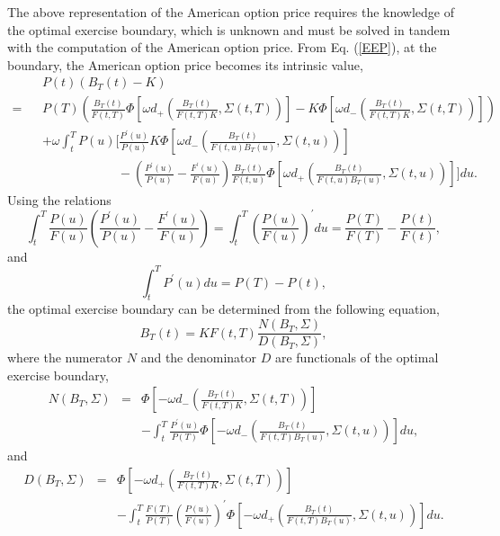 \documentclass[12pt]{article}
\begin{document}
    The above representation of the American option price requires the knowledge of the optimal
    exercise boundary, which is unknown and must be solved in tandem with the computation of the American
    option price. From Eq. (\ref{EEP}), at the boundary, the American option price becomes its intrinsic
    value,
    \begin{eqnarray}
       \label{Boundary}
       && P(t)\left(B_T(t)-K\right)\nonumber\\
      =&& P(T)\left(\frac{B_T(t)}{F(t,T)}\Phi\left[\omega d_+\left(\frac{B_T(t)}{F(t,T)K},\Sigma(t,T)\right)\right]
                                                      -K\Phi\left[\omega d_-\left(\frac{B_T(t)}{F(t,T)K},\Sigma(t,T)\right)\right]\right)\nonumber\\
       &&+\omega\int_t^TP(u)\Bigg[\frac{P^{\prime}(u)}{P(u)} K
       \Phi\left[\omega d_-\left(\frac{B_T(t)}{F(t,u)B_T(u)}, \Sigma(t,u)\right)\right] \nonumber\\
       &&\quad\quad\quad\quad\quad\quad - \left(\frac{P^{\prime}(u)}{P(u)}-\frac{F^{\prime}(u)}{F(u)}\right)
       \frac{B_T(t)}{F(t,u)}\Phi\left[\omega d_+\left(\frac{B_T(t)}{F(t,u)B_T(u)}, \Sigma(t,u)\right)\right] \Bigg]du.
    \end{eqnarray}
    Using the relations
    \begin{equation}
     \int_t^T \frac{P(u)}{F(u)}\left(\frac{P^{\prime}(u)}{P(u)}-\frac{F^{\prime}(u)}{F(u)}\right)
     = \int_t^T\left(\frac{P(u)}{F(u)}\right)^{\prime}du=\frac{P(T)}{F(T)} - \frac{P(t)}{F(t)},
    \end{equation}
    and
    \begin{equation}
      \int_t^TP^{\prime}(u)du=P(T)-P(t),
    \end{equation}
    the optimal exercise boundary can be determined from the following equation,
    \begin{equation}
      B_T(t)=KF(t,T)\frac{N\left(B_T, \Sigma\right)}{D\left(B_T, \Sigma\right)},
    \end{equation}
    where the numerator $N$ and the denominator $D$ are functionals of the optimal exercise boundary,
    \begin{eqnarray}
      N\left(B_T, \Sigma\right)&=&\Phi\left[-\omega d_-\left(\frac{B_T(t)}{F(t,T)K},\Sigma(t,T)\right)\right]\nonumber\\
      &&-\int_t^T\frac{P^{\prime}(u)}{P(T)}\Phi\left[-\omega d_-\left(\frac{B_T(t)}{F(t,T)B_T(u)},\Sigma(t,u)\right)\right]du,
    \end{eqnarray}
    and
    \begin{eqnarray}
      D\left(B_T, \Sigma\right)&=&\Phi\left[-\omega d_+\left(\frac{B_T(t)}{F(t,T)K},\Sigma(t,T)\right)\right]\nonumber\\
      &&-\int_t^T\frac{F(T)}{P(T)}\left(\frac{P(u)}{F(u)}\right)^{\prime}\Phi\left[-\omega d_+\left(\frac{B_T(t)}{F(t,T)B_T(u)},\Sigma(t,u)\right)\right]du.
    \end{eqnarray}
\end{document}
